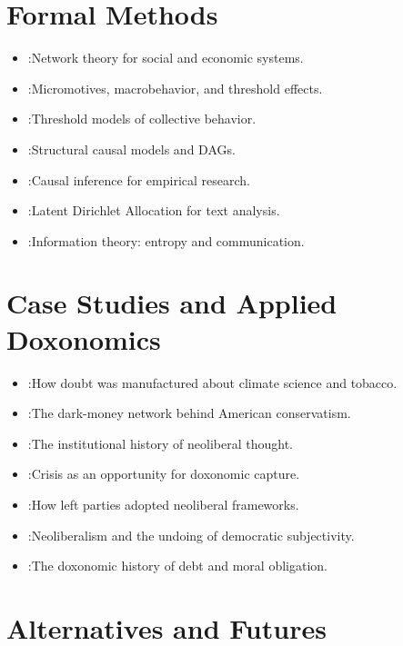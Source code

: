 \section*{Formal Methods}

\begin{itemize}[nosep]
  \item \textcite{jackson2008}:Network theory for social and economic systems.
  \item \textcite{schelling1978}:Micromotives, macrobehavior, and threshold effects.
  \item \textcite{granovetter1978}:Threshold models of collective behavior.
  \item \textcite{pearl2009}:Structural causal models and DAGs.
  \item \textcite{angrist2009}:Causal inference for empirical research.
  \item \textcite{blei2003}:Latent Dirichlet Allocation for text analysis.
  \item \textcite{shannon1948}:Information theory: entropy and communication.
\end{itemize}

\section*{Case Studies and Applied Doxonomics}

\begin{itemize}[nosep]
  \item \textcite{oreskes2010}:How doubt was manufactured about climate science and tobacco.
  \item \textcite{mayer2016}:The dark-money network behind American conservatism.
  \item \textcite{mirowski2009}:The institutional history of neoliberal thought.
  \item \textcite{klein2007}:Crisis as an opportunity for doxonomic capture.
  \item \textcite{mudge2018}:How left parties adopted neoliberal frameworks.
  \item \textcite{brown2015}:Neoliberalism and the undoing of democratic subjectivity.
  \item \textcite{graeber2011}:The doxonomic history of debt and moral obligation.
\end{itemize}

\section*{Alternatives and Futures}

